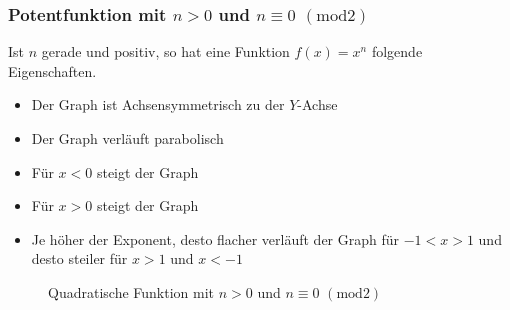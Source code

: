 \subsubsection{Potentfunktion mit $n>0 $ und $ n\equiv0$ $(\mathrm{mod}2)$}
Ist $n$ gerade und positiv, so hat eine Funktion $f(x)=x	^n$ folgende Eigenschaften.
\begin{itemize}
	\item Der Graph ist Achsensymmetrisch zu der $Y$-Achse
	\item Der Graph verläuft parabolisch
	\item Für $x<0$ steigt der Graph
	\item Für $x>0$ steigt der Graph
	\item Je höher der Exponent, desto flacher verläuft der Graph für $-1<x>1$ und desto steiler für $x>1$ und $x<-1$
\end{itemize}
\begin{figure}[h!]
\centering
{}
\caption{Quadratische Funktion mit $n>0$ und $ n\equiv0$ $(\mathrm{mod}2)$}
\end{figure}
